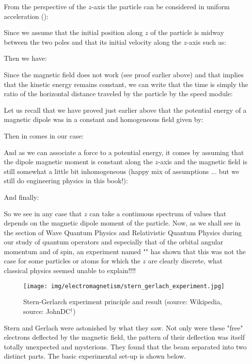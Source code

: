 	From the perspective of the $z$-axis the particle can be considered in uniform acceleration ():
	
	Since we assume that the initial position along $z$ of the particle is midway between the two poles and that its initial velocity along the $z$-axis such as:
	
	Then we have:
	
	Since the magnetic field does not work (see proof earlier above) and that implies that the kinetic energy remains constant, we can write that the time is simply the ratio of the horizontal distance traveled by the particle by the speed module:
	
	Let us recall that we have proved just earlier above that the potential energy of a magnetic dipole was in a constant and homogeneous field given by:
	
	Then in comes in our case:
	
	And as we can associate a force to a potential energy, it comes by assuming that the dipole magnetic moment is constant along the $z$-axis and the magnetic field is still somewhat a little bit inhomogeneous (happy mix of assumptions ... but we still do engineering physics in this book!):
	
	And finally:
	
	So we see in any case that $z$ can take a continuous spectrum of values that depends on the magnetic dipole moment of the particle. Now, as we shall see in the section of Wave Quantum Physics and Relativistic Quantum Physics during our study of quantum operators and especially that of the orbital angular momentum and of spin, an experiment named "" has shown that this was not the case for some particles or atoms for which the $z$ are clearly discrete, what classical physics seemed unable to explain!!!!
	\begin{figure}[H]
		\centering
		\texttt{[image: img/electromagnetism/stern\_gerlach\_experiment.jpg]}
		\caption[]{Stern-Gerlarch experiment principle and result (source: Wikipedia, source: JohnDC$^\dagger$)}
	\end{figure}
	Stern and Gerlach were astonished by what they saw. Not only were these "free" electrons deflected by the magnetic field, the pattern of their deflection was itself totally unexpected and mysterious. They found that the beam separated into two distinct parts. The basic experimental set-up is shown below.

